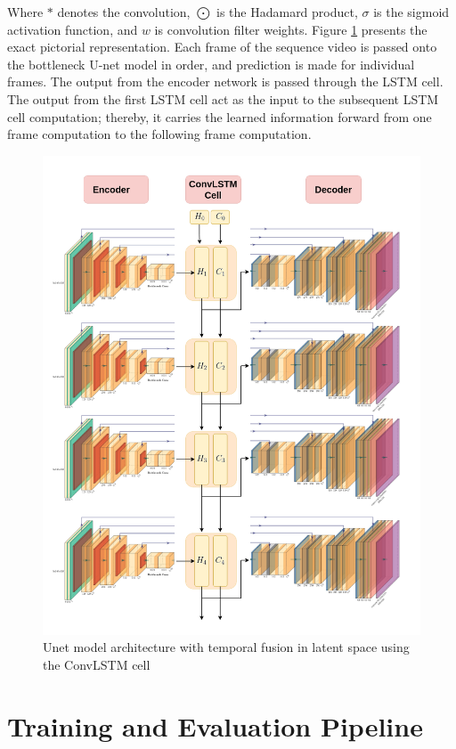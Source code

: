     Where $*$ denotes the convolution, $\bigodot$ is the Hadamard product, $\sigma$ is the sigmoid activation function, and $w$ is convolution filter weights. Figure \ref{fig:unet_lstm} presents the exact pictorial representation. Each frame of the sequence video is passed onto the bottleneck U-net model in order, and prediction is made for individual frames. The output from the encoder network is passed through the LSTM cell. The output from the first LSTM cell act as the input to the subsequent LSTM cell computation; thereby, it carries the learned information forward from one frame computation to the following frame computation.   
    
	\begin{figure}
		\centering
		\includegraphics[width=14cm]{images/unet_lstm.png}
		\caption{Unet model architecture with temporal fusion in latent space using the ConvLSTM cell}
		\label{fig:unet_lstm}
	\end{figure}     
        
    \section{Training and Evaluation Pipeline}
    
